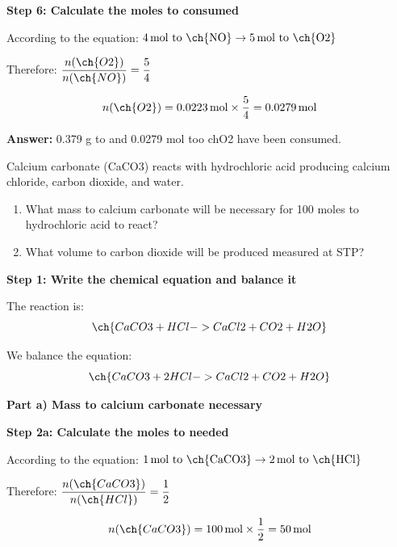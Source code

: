 \begin{exercise}
\begin{solu}
        \textbf{Step 6: Calculate the moles to  consumed}

        According to the equation: $4\,\text{mol to \ch{NO}} \rightarrow 5\,\text{mol to \ch{O2}}$

        Therefore: $\dfrac{n(\ch{O2})}{n(\ch{NO})} = \dfrac{5}{4}$

        \begin{equation*}
            n(\ch{O2}) = 0.0223\,\text{mol} \times \frac{5}{4} = 0.0279\,\text{mol}
        \end{equation*}

        \textbf{Answer:} 0.379 g to  and 0.0279 mol too ch{O2} have been consumed.
    \end{solu}
\end{exercise}

\begin{exercise}
    Calcium carbonate (CaCO3) reacts with hydrochloric acid producing calcium
    chloride, carbon dioxide, and water.
    \begin{enumerate}[label=\letraminuscula]
    \item
    What mass to calcium carbonate will be necessary for 100 moles to
    hydrochloric acid to react?
    \item
    What volume to carbon dioxide will be produced measured at STP?
    \end{enumerate}
    \begin{solu}
        \textbf{Step 1: Write the chemical equation and balance it}

        The reaction is:
        \begin{equation*}
            \ch{CaCO3 + HCl -> CaCl2 + CO2 + H2O}
        \end{equation*}

        We balance the equation:
        \begin{equation*}
            \ch{CaCO3 + 2 HCl -> CaCl2 + CO2 + H2O}
        \end{equation*}

        \textbf{Part a) Mass to calcium carbonate necessary}

        \textbf{Step 2a: Calculate the moles to  needed}

        According to the equation: $1\,\text{mol to \ch{CaCO3}} \rightarrow 2\,\text{mol to \ch{HCl}}$

        Therefore: $\dfrac{n(\ch{CaCO3})}{n(\ch{HCl})} = \dfrac{1}{2}$

        \begin{equation*}
            n(\ch{CaCO3}) = 100\,\text{mol} \times \frac{1}{2} = 50\,\text{mol}
        \end{equation*}


\end{solu}
\end{exercise}
